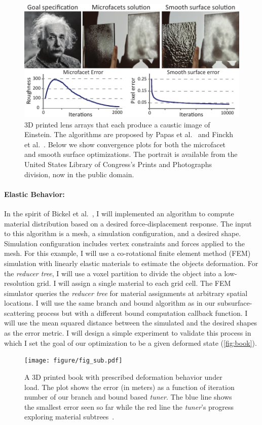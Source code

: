 \begin{figure}
\centering
\includegraphics[width=0.65\linewidth]{figure/fig_caustic.pdf}
\caption {3D printed lens arrays that each produce a caustic image of Einstein. The algorithms are proposed by Papas et al.~ and Finckh et al.~.
Below we show convergence plots for both the microfacet and smooth surface optimizations.
The portrait is available from the United States Library of Congress's Prints and Photographs division,
now in the public domain.
}
\label{fig:caust2}
\end{figure}

\paragraph{Elastic Behavior:}
In the spirit of Bickel et al.~, I will implemented an algorithm to compute material distribution based on a desired force-displacement response.
The input to this algorithm is a mesh, a simulation configuration, and a desired shape.
Simulation configuration includes vertex constraints and forces applied to the mesh.
For this example, I will use a co-rotational finite element method (FEM) simulation with linearly elastic materials to estimate the objects deformation.
For the \emph{reducer tree}, I will use a voxel partition to divide the object into a low-resolution grid.
I will assign a single material to each grid cell.
The FEM simulator queries the \emph{reducer tree} for material assignments at arbitrary spatial locations.
I will use the same branch and bound algorithm as in our subsurface-scattering process but with a different bound computation callback function.
I will use the mean squared distance between the simulated and the desired shapes as the error metric.
I will design a simple experiment to validate this process in which I set the goal of our optimization to be a given deformed state (\autoref{fig:book}).

\begin{figure}
\centering
\texttt{[image: figure/fig\_sub.pdf]}
\caption {A 3D printed book with prescribed deformation behavior under load.
The plot shows the error (in meters) as a function of iteration number of our branch and bound based \emph{tuner}.
The blue line shows the smallest error seen so far while the red line the \emph{tuner}'s progress exploring material subtrees~\protect\cite{Bickel:2009}.}
\label{fig:book}
\end{figure}

